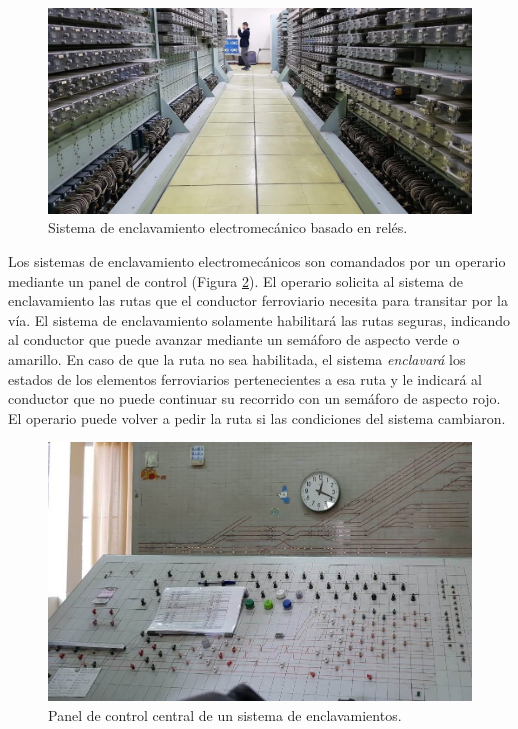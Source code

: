     \begin{figure}[H]
        \centering
        \includegraphics[width=1\textwidth]{Figuras/relees.jpg}
        \centering\caption{Sistema de enclavamiento electromecánico basado en relés.}
        \label{fig:enclavamiento_2}
    \end{figure} 
    
    Los sistemas de enclavamiento electromecánicos son comandados por un operario mediante un panel de control (Figura \ref{fig:enclavamiento_3}). El operario solicita al sistema de enclavamiento las rutas que el conductor ferroviario necesita para transitar por la vía. El sistema de enclavamiento solamente habilitará las rutas seguras, indicando al conductor que puede avanzar mediante un semáforo de aspecto verde o amarillo. En caso de que la ruta no sea habilitada, el sistema \textit{enclavará} los estados de los elementos ferroviarios pertenecientes a esa ruta y le indicará al conductor que no puede continuar su recorrido con un semáforo de aspecto rojo. El operario puede volver a pedir la ruta si las condiciones del sistema cambiaron.
    
    \begin{figure}[H]
        \centering
        \includegraphics[width=1\textwidth]{Figuras/llavallol.jpg}
        \centering\caption{Panel de control central de un sistema de enclavamientos.} %
        \label{fig:enclavamiento_3}
    \end{figure}

